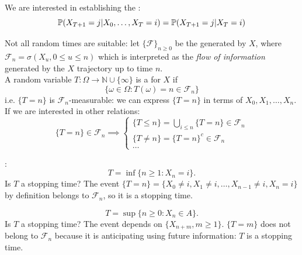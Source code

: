 \documentclass{article}
\begin{document}
\begin{definition}{}
    We are interested in establishing the :
    \begin{equation}
        \mathbb{P}(X_{T+1}=j|X_0,\ldots,X_T=i)=\mathbb{P}(X_{T+1}=j|X_T=i)
    \end{equation}
\end{definition}
Not all random times are suitable: let $\{\mathscr{F}\}_{n\geqslant 0}$ be the  generated by $X$, where $\mathscr{F}_n=\sigma(X_u, 0\leqslant u \leqslant n)$ which is interpreted as the \textit{flow of information} generated by the $X$ trajectory up to time $n$.\\ A random variable $T:\Omega\rightarrow\mathbb{N}\cup\{\infty\}$ is a  for $X$ if 
\[
\{\omega\in\Omega :T(\omega)=n\in\mathscr{F}_n\}
\]
i.e. $\{T=n\}$ is $\mathscr{F}_n$-measurable: we can express $\{T=n\}$ in terms of $X_0,X_1,\ldots,X_n$. If we are interested in other relations:
\[
    \{T=n\}\in\mathscr{F}_n\implies\begin{cases}
        \{T\leqslant n\}=\bigcup_{i \leqslant n}\{T=n\}\in\mathscr{F}_n\\
        \{T\neq n\}=\{T=n\}^c\in\mathscr{F}_n\\
        \ldots
    \end{cases}
\]

\begin{example}{:}
    \[
    T=\inf\{n\geqslant 1: X_n=i\}.
    \]
    Is $T$ a stopping time? The event $\{T=n\}=\{X_0 \neq i, X_1 \neq i, \ldots, X_{n-1}\neq i, X_n=i\}$ by definition belongs to $\mathscr{F}_n$, so it is a stopping time.
\end{example}
\begin{example}{}
    \[
    T=\sup\{n\geqslant 0: X_n\in A\}.
    \]
    Is $T$ a stopping time? The event depends on $\{X_{n+m},m\geqslant 1\}$. $\{T=m\}$ does not belong to $\mathscr{F}_n$ because it is anticipating using future information: $T$ is  a stopping time.
\end{example}
\end{document}
